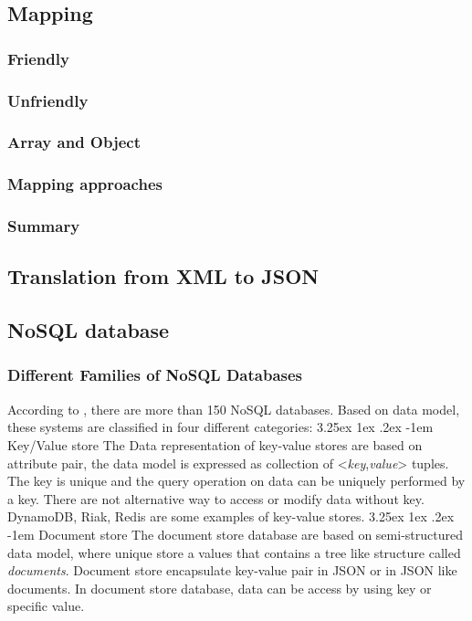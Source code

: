 \documentclass[a4paper,12pt]{article}
\makeatletter
\renewcommand\paragraph{\@startsection{paragraph}{5}{\z@}%
	{3.25ex \@plus1ex \@minus.2ex}%
	{-1em}%
	{\normalfont\normalsize\bfseries}}
\makeatother
\begin{document}
		\subsection{Mapping}
			\subsubsection{Friendly}
			\subsubsection{Unfriendly}
			\subsubsection{Array and Object}
			\subsubsection{Mapping approaches}
			\subsubsection{Summary}
		\subsection{Translation from XML to JSON}
		\subsection{NoSQL database}
			\subsubsection{Different Families of NoSQL Databases}
			According to \cite{nosql:org}, there are more than 150 NoSQL databases. Based on data model, these  systems are classified in four different categories:
			\paragraph{Key/Value store}
				The Data representation of key-value stores are based on attribute pair, the data model is expressed as collection of <\textit{key},\textit{value}> tuples. The key is unique and the query operation on data can be uniquely performed by a key. There are not alternative way to access or modify data without key.  DynamoDB, Riak, Redis are some examples of key-value stores.
			\paragraph{Document store}
				The document store database are based on semi-structured data model, where unique store a values that contains a tree like structure called \textit{documents}. Document store encapsulate key-value pair in JSON or in JSON like documents\cite{hecht2011nosql}. In document store database, data can be access by using key or specific value. 
\end{document}
